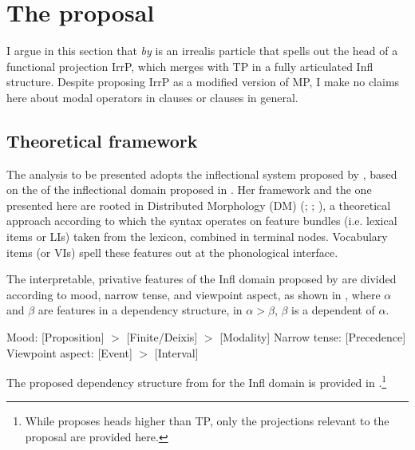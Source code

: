 \documentclass[output=paper,modfonts,newtxmath,hidelinks,]{langscibook}
\begin{document}
\section{The proposal}\label{10:s4}

I argue in this section that \textit{by} is an irrealis particle that spells out the head of a functional projection IrrP, which merges with TP in a fully articulated Infl structure. Despite proposing IrrP as a modified version of  MP, I make no claims here about modal operators in   clauses or  clauses in general. 

\subsection{Theoretical framework}\label{10:s4.1}

The analysis to be presented adopts the inflectional system proposed by \citet{Cowper2010}, based on the  of the inflectional domain proposed in \citet{Cowper2005}. Her framework and the one presented here are rooted in Distributed Morphology (DM) (\citealt{HalleMarantz1993}; \citealt{EmbickNoyer2007}; \citealt{Bobaljik}), a theoretical approach according to which the syntax operates on feature bundles (i.e. lexical items or LIs) taken from the lexicon, combined in terminal nodes. Vocabulary items (or VIs) spell these features out at the phonological interface. 

The interpretable, privative features of the Infl domain proposed by \citet{Cowper2005} are divided according to mood, narrow tense, and viewpoint aspect, as shown in , where $\alpha$ and $\beta$ are features in a dependency structure, in $\alpha >\beta$, $\beta$ is a dependent of $\alpha$.\largerpage[2]

\ea \label{10:ex22}
Mood: [Proposition] $>$ [Finite/Deixis] $>$ [Modality]
\newline Narrow tense: [Precedence]
\newline Viewpoint aspect: [Event] $>$ [Interval] \hfill \citep[1]{Cowper2010}
\z


\noindent The proposed dependency structure from \citet{Cowper2010} for the  Infl domain is provided in .\footnote{\label{10:fn1}While \citet{Cowper2010} proposes heads higher than TP, only the projections relevant to the  proposal are provided here.}
\end{document}

